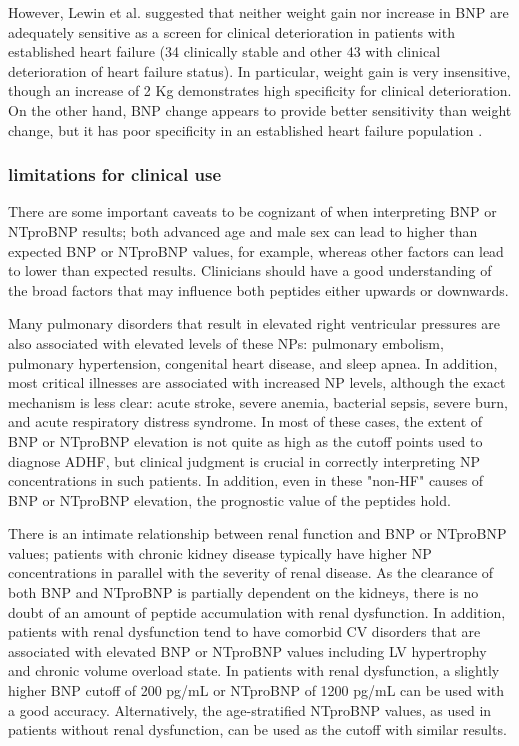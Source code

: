 \documentclass[14pt,a4paper,onecolumn]{extarticle}
\begin{document}
However, Lewin et al.  suggested that neither weight gain nor increase in BNP are adequately sensitive as a screen for clinical deterioration in patients with established heart failure (34 clinically stable and other 43 with clinical deterioration of heart failure status). In particular, weight gain is very insensitive, though an increase of 2 Kg demonstrates high specificity for clinical deterioration. On the other hand, BNP change appears to provide better sensitivity than weight change, but it has poor specificity in an established heart failure population \citep{bib3295}.

\clearpage
\subsubsection{limitations for clinical use}

There are some important caveats to be cognizant of when interpreting BNP or NTproBNP results; both advanced age and male sex can lead to higher than expected BNP or NTproBNP values, for example, whereas other factors can lead to lower than expected results. Clinicians should have a good understanding of the broad factors that may influence both peptides either upwards or downwards.\citep{Gaggin2014}

Many pulmonary disorders that result in elevated right ventricular pressures are also associated with elevated levels of these NPs: pulmonary embolism, pulmonary hypertension, congenital heart disease, and sleep apnea. In addition, most critical illnesses are associated with increased NP levels, although the exact mechanism is less clear: acute stroke, severe anemia, bacterial sepsis, severe burn, and acute respiratory distress syndrome. In most of these cases, the extent of BNP or NTproBNP elevation is not quite as high as the cutoff points used to diagnose ADHF, but clinical judgment is crucial in correctly interpreting NP concentrations in such patients. In addition, even in these "non-HF" causes of BNP or NTproBNP elevation, the prognostic value of the peptides hold. \citep{Gaggin2014}

There is an intimate relationship between renal function and BNP or NTproBNP values; patients with chronic kidney disease typically have higher NP concentrations in parallel with the severity of renal disease. As the clearance of both BNP and NTproBNP is partially dependent on the kidneys, there is no doubt of an amount of peptide accumulation with renal dysfunction. In addition, patients with renal dysfunction tend to have comorbid CV disorders that are associated with elevated BNP or NTproBNP values including LV hypertrophy and chronic volume overload state. In patients with renal dysfunction, a slightly higher BNP cutoff of 200 pg/mL or NTproBNP of 1200 pg/mL can be used with a good accuracy. Alternatively, the age-stratified NTproBNP values, as used in patients without renal dysfunction, can be used as the cutoff with similar results. \citep{Gaggin2014}
\end{document}
